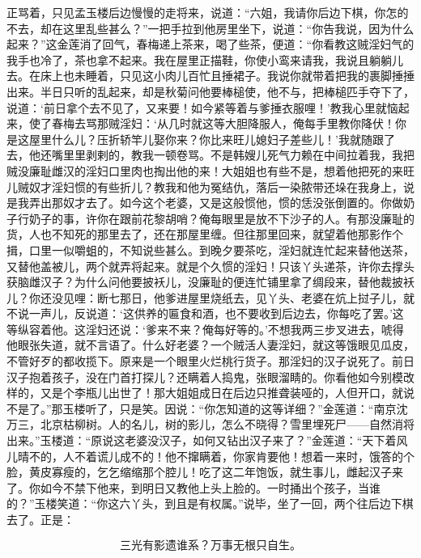 正骂着，只见孟玉楼后边慢慢的走将来，说道：“六姐，我请你后边下棋，你怎的不去，却在这里乱些甚么？”一把手拉到他房里坐下，说道：“你告我说，因为什么起来？”这金莲消了回气，春梅递上茶来，喝了些茶，便道：“你看教这贼淫妇气的我手也冷了，茶也拿不起来。我在屋里正描鞋，你使小鸾来请我，我说且躺躺儿去。在床上也未睡着，只见这小肉儿百忙且捶裙子。我说你就带着把我的裹脚捶捶出来。半日只听的乱起来，却是秋菊问他要棒槌使，他不与，把棒槌匹手夺下了，说道：‘前日拿个去不见了，又来要！如今紧等着与爹捶衣服哩！’教我心里就恼起来，使了春梅去骂那贼淫妇：‘从几时就这等大胆降服人，俺每手里教你降伏！你是这屋里什么儿？压折轿竿儿娶你来？你比来旺儿媳妇子差些儿！’我就随跟了去，他还嘴里里剥剌的，教我一顿卷骂。不是韩嫂儿死气力赖在中间拉着我，我把贼没廉耻雌汉的淫妇口里肉也掏出他的来！大姐姐也有些不是，想着他把死的来旺儿贼奴才淫妇惯的有些折儿？教我和他为冤结仇，落后一染脓带还垛在我身上，说是我弄出那奴才去了。如今这个老婆，又是这般惯他，惯的恁没张倒置的。你做奶子行奶子的事，许你在跟前花黎胡哨？俺每眼里是放不下沙子的人。有那没廉耻的货，人也不知死的那里去了，还在那屋里缠。但往那里回来，就望着他那影作个揖，口里一似嚼蛆的，不知说些甚么。到晚夕要茶吃，淫妇就连忙起来替他送茶，又替他盖被儿，两个就弄将起来。就是个久惯的淫妇！只该丫头递茶，许你去撑头获脑雌汉子？为什么问他要披袄儿，没廉耻的便连忙铺里拿了绸段来，替他裁披袄儿？你还没见哩：断七那日，他爹进屋里烧纸去，见丫头、老婆在炕上挝子儿，就不说一声儿，反说道：‘这供养的匾食和酒，也不要收到后边去，你每吃了罢。’这等纵容着他。这淫妇还说：‘爹来不来？俺每好等的。’不想我两三步叉进去，唬得他眼张失道，就不言语了。什么好老婆？一个贼活人妻淫妇，就这等饿眼见瓜皮，不管好歹的都收揽下。原来是一个眼里火烂桃行货子。那淫妇的汉子说死了。前日汉子抱着孩子，没在门首打探儿？还瞒着人捣鬼，张眼溜睛的。你看他如今别模改样的，又是个李瓶儿出世了！那大姐姐成日在后边只推聋装哑的，人但开口，就说不是了。”那玉楼听了，只是笑。因说：“你怎知道的这等详细？”金莲道：“南京沈万三，北京枯柳树。人的名儿，树的影儿，怎么不晓得？雪里埋死尸——自然消将出来。”玉楼道：“原说这老婆没汉子，如何又钻出汉子来了？”金莲道：“天下着风儿晴不的，人不着谎儿成不的！他不撺瞒着，你家肯要他！想着一来时，饿答的个脸，黄皮寡瘦的，乞乞缩缩那个腔儿！吃了这二年饱饭，就生事儿，雌起汉子来了。你如今不禁下他来，到明日又教他上头上脸的。一时捅出个孩子，当谁的？”玉楼笑道：“你这六丫头，到且是有权属。”说毕，坐了一回，两个往后边下棋去了。正是：

\[
三光有影遗谁系？万事无根只自生。
\]

